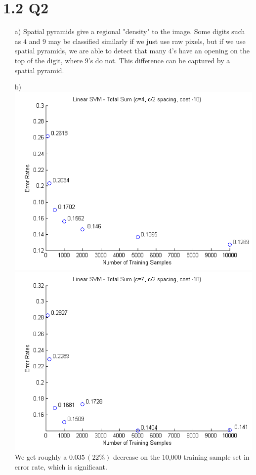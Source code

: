 \documentclass[11pt]{article}
\begin{document}
\section*{1.2 Q2}
\begin{itemize}
\item[a)]
Spatial pyramids give a regional "density" to the image. Some digits such as $4$ and $9$ may be classified similarly if we just use raw pixels, but if we use spatial pyramids, we are able to detect that many $4$'s have an opening on the top of the digit, where $9$'s do not. This difference can be captured by a spatial pyramid.
\item[b)]
\includegraphics[scale=0.6]{diagrams/Question12b1.png}
\includegraphics[scale=0.6]{diagrams/Question12b2.png}\\
We get roughly a $0.035\,(22\%)$ decrease on the 10,000 training sample set in error rate, which is significant.
\end{itemize}
\newpage
\end{document}
